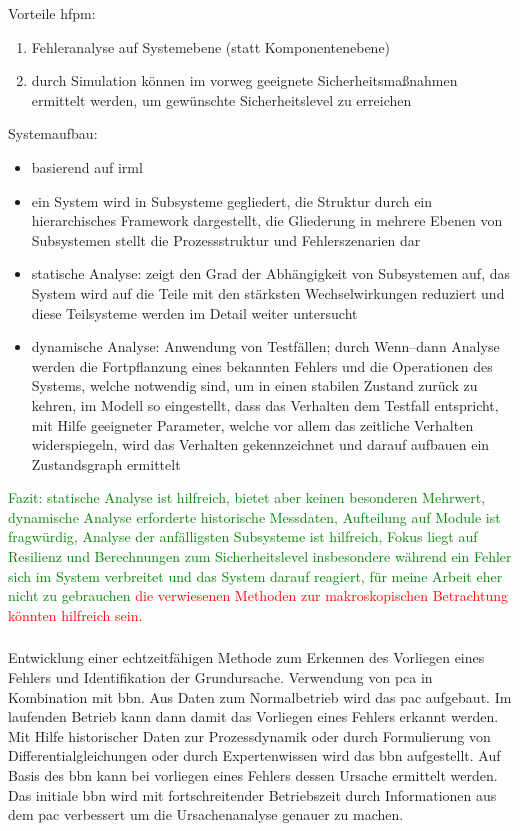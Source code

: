 Vorteile \ac{hfpm}: \begin{enumerate}
\item Fehleranalyse auf Systemebene (statt Komponentenebene)
\item durch Simulation k\"onnen im vorweg geeignete Sicherheitsma\ss{}nahmen ermittelt werden, um gew\"unschte Sicherheitslevel zu erreichen
\end{enumerate}
Systemaufbau: \begin{itemize}
\item basierend auf \ac{irml}
\item ein System wird in Subsysteme gegliedert, die Struktur durch ein hierarchisches Framework dargestellt, die Gliederung in mehrere Ebenen von Subsystemen stellt die Prozessstruktur und Fehlerszenarien dar
\item statische Analyse: zeigt den Grad der Abh\"angigkeit von Subsystemen auf, das System wird auf die Teile mit den st\"arksten Wechselwirkungen reduziert und diese Teilsysteme werden im Detail weiter untersucht
\item dynamische Analyse: Anwendung von Testf\"allen; durch Wenn--dann Analyse werden die Fortpflanzung eines bekannten Fehlers und die Operationen des Systems, welche notwendig sind, um in einen stabilen Zustand zur\"uck zu kehren, im Modell so eingestellt, dass das Verhalten dem Testfall entspricht, mit Hilfe geeigneter Parameter, welche vor allem das zeitliche Verhalten widerspiegeln, wird das Verhalten gekennzeichnet und darauf aufbauen ein Zustandsgraph ermittelt
\end{itemize}

\textcolor{green}{Fazit: statische Analyse ist hilfreich, bietet aber keinen besonderen Mehrwert, dynamische Analyse erforderte historische Messdaten, Aufteilung auf Module ist fragw\"urdig, Analyse der anf\"alligsten Subsysteme ist hilfreich, Fokus liegt auf Resilienz und Berechnungen zum Sicherheitslevel insbesondere w\"ahrend ein Fehler sich im System verbreitet und das System darauf reagiert, f\"ur meine Arbeit eher nicht zu gebrauchen}
\textcolor{red}{die verwiesenen Methoden zur makroskopischen Betrachtung k\"onnten hilfreich sein.}

\subsubsection{\cite{Mallick_2013}} Entwicklung einer echtzeitf\"ahigen Methode zum Erkennen des Vorliegen eines Fehlers und Identifikation der Grundursache. Verwendung von \ac{pca} in Kombination mit \ac{bbn}. Aus Daten zum Normalbetrieb wird das \ac{pac} aufgebaut. Im laufenden Betrieb kann dann damit das Vorliegen eines Fehlers erkannt werden. Mit Hilfe historischer Daten zur Prozessdynamik oder durch Formulierung von Differentialgleichungen oder durch Expertenwissen wird das \ac{bbn} aufgestellt. Auf Basis des \ac{bbn} kann bei vorliegen eines Fehlers dessen Ursache ermittelt werden. Das initiale \ac{bbn} wird mit fortschreitender Betriebszeit durch Informationen aus dem \ac{pac} verbessert um die Ursachenanalyse genauer zu machen.  

